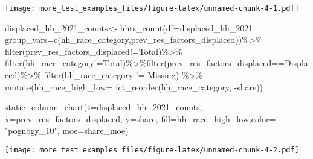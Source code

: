 \documentclass[
]{article}
\newenvironment{Shaded}{\begin{snugshade}}{\end{snugshade}}
\newcommand{\AttributeTok}[1]{\textcolor[rgb]{0.77,0.63,0.00}{#1}}
\newcommand{\FunctionTok}[1]{\textcolor[rgb]{0.00,0.00,0.00}{#1}}
\newcommand{\NormalTok}[1]{#1}
\newcommand{\OtherTok}[1]{\textcolor[rgb]{0.56,0.35,0.01}{#1}}
\newcommand{\SpecialCharTok}[1]{\textcolor[rgb]{0.00,0.00,0.00}{#1}}
\newcommand{\StringTok}[1]{\textcolor[rgb]{0.31,0.60,0.02}{#1}}
\begin{document}
\texttt{[image: more\_test\_examples\_files/figure-latex/unnamed-chunk-4-1.pdf]}

\begin{Shaded}
\begin{Highlighting}[]
\NormalTok{displaced\_hh\_2021\_counts}\OtherTok{\textless{}{-}} \FunctionTok{hhts\_count}\NormalTok{(}\AttributeTok{df=}\NormalTok{displaced\_hh\_2021, }\AttributeTok{group\_vars=}\FunctionTok{c}\NormalTok{(}\StringTok{\textquotesingle{}hh\_race\_category\textquotesingle{}}\NormalTok{,}\StringTok{\textquotesingle{}prev\_res\_factors\_displaced\textquotesingle{}}\NormalTok{))}\SpecialCharTok{\%\textgreater{}\%}
\FunctionTok{filter}\NormalTok{(prev\_res\_factors\_displaced}\SpecialCharTok{!=}\StringTok{\textquotesingle{}Total\textquotesingle{}}\NormalTok{)}\SpecialCharTok{\%\textgreater{}\%}
  \FunctionTok{filter}\NormalTok{(hh\_race\_category}\SpecialCharTok{!=}\StringTok{\textquotesingle{}Total\textquotesingle{}}\NormalTok{)}\SpecialCharTok{\%\textgreater{}\%}\FunctionTok{filter}\NormalTok{(prev\_res\_factors\_displaced}\SpecialCharTok{==}\StringTok{\textquotesingle{}Displaced\textquotesingle{}}\NormalTok{)}\SpecialCharTok{\%\textgreater{}\%}
  \FunctionTok{filter}\NormalTok{(hh\_race\_category }\SpecialCharTok{!=} \StringTok{\textquotesingle{}Missing\textquotesingle{}}\NormalTok{) }\SpecialCharTok{\%\textgreater{}\%}
  \FunctionTok{mutate}\NormalTok{(}\AttributeTok{hh\_race\_high\_low=} \FunctionTok{fct\_reorder}\NormalTok{(hh\_race\_category, }\SpecialCharTok{{-}}\NormalTok{share))}

\FunctionTok{static\_column\_chart}\NormalTok{(}\AttributeTok{t=}\NormalTok{displaced\_hh\_2021\_counts, }\AttributeTok{x=}\StringTok{\textquotesingle{}prev\_res\_factors\_displaced\textquotesingle{}}\NormalTok{, }\AttributeTok{y=}\StringTok{\textquotesingle{}share\textquotesingle{}}\NormalTok{, }\AttributeTok{fill=}\StringTok{\textquotesingle{}hh\_race\_high\_low\textquotesingle{}}\NormalTok{,}\AttributeTok{color=}  \StringTok{"pognbgy\_10"}\NormalTok{, }\AttributeTok{moe=}\StringTok{\textquotesingle{}share\_moe\textquotesingle{}}\NormalTok{)}
\end{Highlighting}
\end{Shaded}

\texttt{[image: more\_test\_examples\_files/figure-latex/unnamed-chunk-4-2.pdf]}
\end{document}
